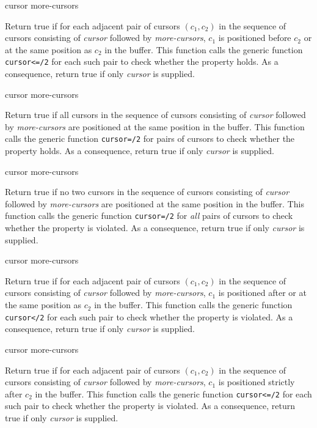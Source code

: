  {cursor \rest more-cursors}

Return true if for each adjacent pair of cursors $(c_1, c_2)$ in the
sequence of cursors consisting of \textit{cursor} followed by
\textit{more-cursors}, $c_1$ is positioned before $c_2$ or at the same
position as $c_2$ in the buffer.  This function calls the generic
function \texttt{cursor<=/2} for each such pair to check whether the
property holds.  As a consequence, return true if only \textit{cursor}
is supplied.

\ifdetachedmany{}

 {cursor \rest more-cursors}

Return true if all cursors in the sequence of cursors consisting of
\textit{cursor} followed by \textit{more-cursors} are positioned at
the same position in the buffer.  This function calls the generic
function \texttt{cursor=/2} for pairs of cursors to check whether the
property holds.  As a consequence, return true if only \textit{cursor}
is supplied.

\ifdetachedmany{}

 {cursor \rest more-cursors}

Return true if no two cursors in the sequence of cursors consisting of
\textit{cursor} followed by \textit{more-cursors} are positioned at
the same position in the buffer.  This function calls the generic
function \texttt{cursor=/2} for \emph{all} pairs of cursors to check
whether the property is violated.  As a consequence, return true if
only \textit{cursor} is supplied.

\ifdetachedmany{}

 {cursor \rest more-cursors}

Return true if for each adjacent pair of cursors $(c_1, c_2)$ in the
sequence of cursors consisting of \textit{cursor} followed by
\textit{more-cursors}, $c_1$ is positioned after or at the same
position as $c_2$ in the buffer.  This function calls the generic
function \texttt{cursor</2} for each such pair to check whether the
property is violated.  As a consequence, return true if only
\textit{cursor} is supplied.

\ifdetachedmany{}

 {cursor \rest more-cursors}

Return true if for each adjacent pair of cursors $(c_1, c_2)$ in the
sequence of cursors consisting of \textit{cursor} followed by
\textit{more-cursors}, $c_1$ is positioned strictly after $c_2$ in the
buffer.  This function calls the generic function \texttt{cursor<=/2}
for each such pair to check whether the property is violated.  As a
consequence, return true if only \textit{cursor} is supplied.

